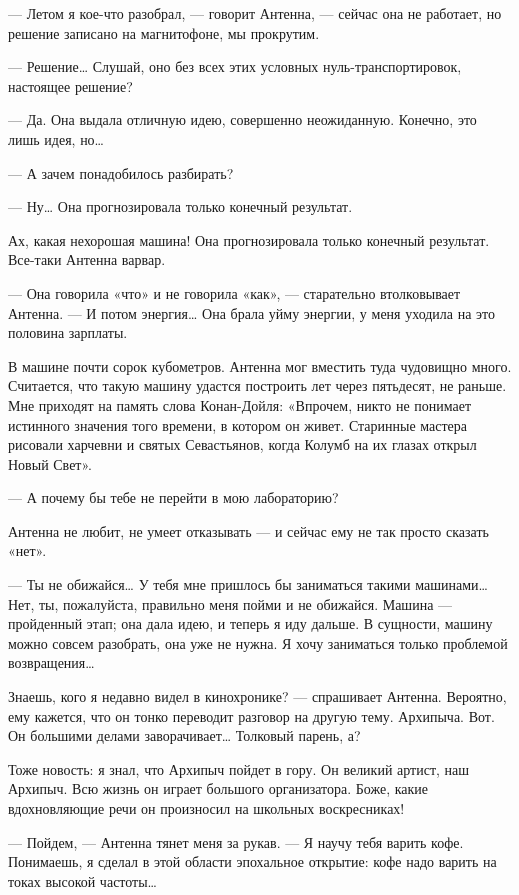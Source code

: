 — Летом я кое-что разобрал, —  говорит Антенна, — сейчас она не  работает,
но решение записано на магнитофоне, мы прокрутим.

— Решение…  Слушай,  оно  без  всех  этих  условных  нуль-транспортировок,
настоящее решение?

— Да. Она выдала отличную идею, совершенно неожиданную. Конечно, это  лишь
идея, но…

— А зачем понадобилось разбирать?

— Ну… Она прогнозировала только конечный результат.

Ах, какая нехорошая машина! Она прогнозировала только конечный  результат.
Все-таки Антенна варвар.

— Она  говорила «что»  и  не говорила  «как», —  старательно  втолковывает
Антенна. — И потом энергия… Она брала уйму энергии, у меня уходила на  это
половина зарплаты.

В машине  почти  сорок кубометров.  Антенна  мог вместить  туда  чудовищно
много. Считается, что такую машину удастся построить лет через  пятьдесят,
не раньше. Мне приходят  на память слова  Конан-Дойля: «Впрочем, никто  не
понимает истинного значения  того времени, в  котором он живет.  Старинные
мастера рисовали харчевни и святых Севастьянов, когда Колумб на их  глазах
открыл Новый Свет».

— А почему бы тебе не перейти в мою лабораторию?

Антенна не любит, не умеет отказывать — и сейчас ему не так просто сказать
«нет».

— Ты не обижайся… У тебя мне пришлось бы заниматься такими машинами…  Нет,
ты, пожалуйста, правильно меня  пойми и не  обижайся. Машина —  пройденный
этап; она  дала идею,  и теперь  я иду  дальше. В  сущности, машину  можно
совсем разобрать, она  уже не  нужна. Я хочу  заниматься только  проблемой
возвращения…

Знаешь,  кого  я  недавно  видел  в  кинохронике?  —  спрашивает  Антенна.
Вероятно, ему кажется,  что он  тонко переводит разговор  на другую  тему.
Архипыча. Вот. Он большими делами заворачивает… Толковый парень, а?

Тоже новость: я знал,  что Архипыч пойдет в  гору. Он великий артист,  наш
Архипыч.  Всю  жизнь   он  играет  большого   организатора.  Боже,   какие
вдохновляющие речи он произносил на школьных воскресниках!

— Пойдем, —  Антенна тянет  меня за  рукав. —  Я научу  тебя варить  кофе.
Понимаешь, я сделал в этой  области эпохальное открытие: кофе надо  варить
на токах высокой частоты…

